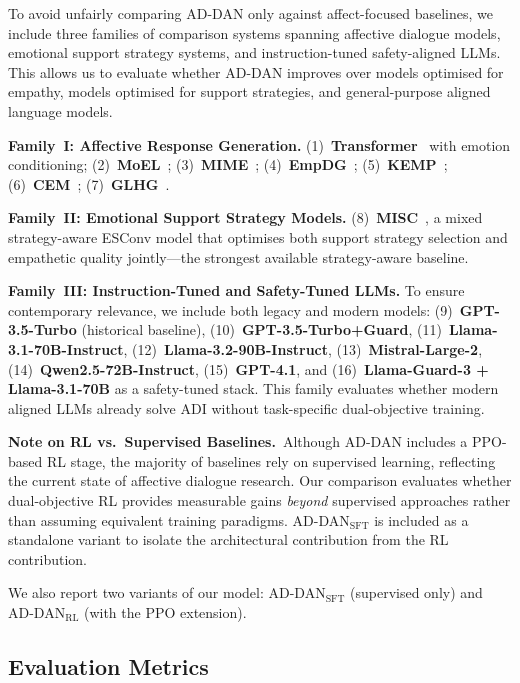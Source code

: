 \documentclass[lettersize,journal]{IEEEtran}
\begin{document}
To avoid unfairly comparing AD-DAN only against affect-focused baselines,
we include three families of comparison systems spanning affective dialogue
models, emotional support strategy systems, and instruction-tuned
safety-aligned LLMs.  This allows us to evaluate whether AD-DAN improves
over models optimised for empathy, models optimised for support strategies,
and general-purpose aligned language models.

\textbf{Family~I: Affective Response Generation.}
(1)~\textbf{Transformer}~\cite{vaswani2017attention} with emotion
conditioning;
(2)~\textbf{MoEL}~\cite{kim2021moel};
(3)~\textbf{MIME}~\cite{majumder2020mime};
(4)~\textbf{EmpDG}~\cite{li2020empdg};
(5)~\textbf{KEMP}~\cite{li2022kemp};
(6)~\textbf{CEM}~\cite{sabour2022cem};
(7)~\textbf{GLHG}~\cite{ma2023glhg}.

\textbf{Family~II: Emotional Support Strategy Models.}
(8)~\textbf{MISC}~\cite{cheng2022fado}, a mixed strategy-aware ESConv model
that optimises both support strategy selection and empathetic quality
jointly—the strongest available strategy-aware baseline.

\textbf{Family~III: Instruction-Tuned and Safety-Tuned LLMs.}
To ensure contemporary relevance, we include both legacy and modern
models: (9)~\textbf{GPT-3.5-Turbo} (historical baseline),
(10)~\textbf{GPT-3.5-Turbo+Guard},
(11)~\textbf{Llama-3.1-70B-Instruct},
(12)~\textbf{Llama-3.2-90B-Instruct},
(13)~\textbf{Mistral-Large-2},
(14)~\textbf{Qwen2.5-72B-Instruct},
(15)~\textbf{GPT-4.1}, and
(16)~\textbf{Llama-Guard-3 + Llama-3.1-70B} as a safety-tuned stack.
This family evaluates whether modern aligned LLMs already solve ADI
without task-specific dual-objective training.

\noindent\textbf{Note on RL vs.\ Supervised Baselines.}~Although
AD-DAN includes a PPO-based RL stage, the majority of baselines rely on
supervised learning, reflecting the current state of affective dialogue
research.  Our comparison evaluates whether dual-objective RL provides
measurable gains \emph{beyond} supervised approaches rather than
assuming equivalent training paradigms.  AD-DAN$_\mathrm{SFT}$ is
included as a standalone variant to isolate the architectural
contribution from the RL contribution.

We also report two variants of our model: AD-DAN$_\mathrm{SFT}$ (supervised
only) and AD-DAN$_\mathrm{RL}$ (with the PPO extension).

\subsection{Evaluation Metrics}
\end{document}
